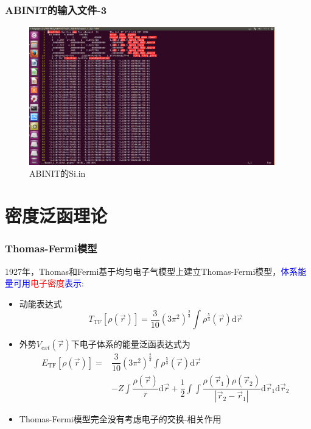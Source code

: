 \documentclass[cjk,slidestop,compress,mathserif,blue]{beamer}
\begin{document}
\frame
{
	\frametitle{ABINIT的输入文件-3}
\begin{figure}[h!]
\centering
\includegraphics[height=0.6087\textwidth,width=0.95\textwidth,viewport=70 400 875 875,clip]{Figures/2016-06-28_Si-4.png}
\caption{\textrm{ABINIT}的Si.in}
\label{X.potential}
\end{figure}
}

\section{密度泛函理论}       %
\frame
{
	\frametitle{\textrm{Thomas-Fermi}模型} 
	1927年，\textrm{Thomas}和\textrm{Fermi}基于均匀电子气模型上建立\textrm{Thomas-Fermi}模型，\textcolor{blue}{体系能量可用}\textcolor{red}{电子密度}\textcolor{blue}{表示}:
	\begin{itemize}
		\item 动能表达式
			$$T_{\mathrm{TF}}[\rho(\vec r)]=\dfrac3{10}(3\pi^2)^{\frac23}\int\rho^{\frac53}(\vec r)\mathrm{d}\vec r$$
		\item 外势$V_{ext}(\vec r)$下电子体系的能量泛函表达式为
			\begin{displaymath}
				\begin{aligned}
					E_{\mathrm{TF}}[\rho(\vec r)]=&\dfrac3{10}(3\pi^2)^{\frac23}\int\rho^{\frac53}(\vec r)\mathrm{d}\vec r\\
					&-Z\int\dfrac{\rho(\vec r)}{r}\mathrm{d}\vec r+\dfrac12\int\int\dfrac{\rho(\vec r_1)\rho(\vec r_2)}{|\vec r_2-\vec r_1|}\mathrm{d}\vec r_1\mathrm{d}\vec r_2
				\end{aligned}
			\end{displaymath}
		\item \textrm{Thomas-Fermi}模型完全没有考虑电子的交换-相关作用
	\end{itemize}
}
\end{document}
